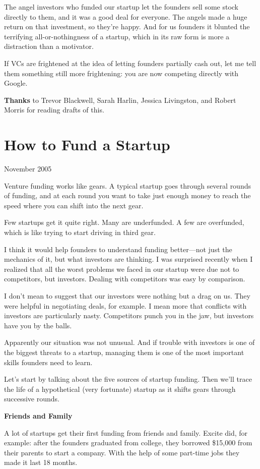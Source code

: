 \documentclass[12pt]{book}
\begin{document}
The angel investors who funded our startup let the founders sell some
stock directly to them, and it was a good deal for everyone. The angels
made a huge return on that investment, so they're happy. And for us
founders it blunted the terrifying all-or-nothingness of a startup,
which in its raw form is more a distraction than a motivator.

If VCs are frightened at the idea of letting founders partially cash
out, let me tell them something still more frightening: you are now
competing directly with Google.

\textbf{Thanks} to Trevor Blackwell, Sarah Harlin, Jessica Livingston,
and Robert Morris for reading drafts of this.
\chapter{How to Fund a Startup}

November 2005

Venture funding works like gears. A typical startup goes through several
rounds of funding, and at each round you want to take just enough money
to reach the speed where you can shift into the next gear.

Few startups get it quite right. Many are underfunded. A few are
overfunded, which is like trying to start driving in third gear.

I think it would help founders to understand funding better---not just
the mechanics of it, but what investors are thinking. I was surprised
recently when I realized that all the worst problems we faced in our
startup were due not to competitors, but investors. Dealing with
competitors was easy by comparison.

I don't mean to suggest that our investors were nothing but a drag on
us. They were helpful in negotiating deals, for example. I mean more
that conflicts with investors are particularly nasty. Competitors punch
you in the jaw, but investors have you by the balls.

Apparently our situation was not unusual. And if trouble with investors
is one of the biggest threats to a startup, managing them is one of the
most important skills founders need to learn.

Let's start by talking about the five sources of startup funding. Then
we'll trace the life of a hypothetical (very fortunate) startup as it
shifts gears through successive rounds.

\textbf{Friends and Family}

A lot of startups get their first funding from friends and family.
Excite did, for example: after the founders graduated from college, they
borrowed \$15,000 from their parents to start a company. With the help
of some part-time jobs they made it last 18 months.
\end{document}
